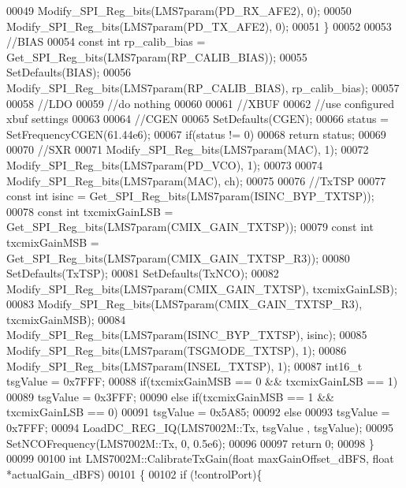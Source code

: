 \begin{DoxyCode}
00049         Modify_SPI_Reg_bits(LMS7param(PD_RX_AFE2), 0);
00050         Modify_SPI_Reg_bits(LMS7param(PD_TX_AFE2), 0);
00051     \}
00052 
00053     \textcolor{comment}{//BIAS}
00054     \textcolor{keyword}{const} \textcolor{keywordtype}{int} rp\_calib\_bias = Get_SPI_Reg_bits(LMS7param(RP_CALIB_BIAS));
00055     SetDefaults(BIAS);
00056     Modify_SPI_Reg_bits(LMS7param(RP_CALIB_BIAS), rp\_calib\_bias);
00057 
00058     \textcolor{comment}{//LDO}
00059     \textcolor{comment}{//do nothing}
00060 
00061     \textcolor{comment}{//XBUF}
00062     \textcolor{comment}{//use configured xbuf settings}
00063 
00064     \textcolor{comment}{//CGEN}
00065     SetDefaults(CGEN);
00066     status = SetFrequencyCGEN(61.44e6);
00067     \textcolor{keywordflow}{if}(status != 0)
00068         \textcolor{keywordflow}{return} status;
00069 
00070     \textcolor{comment}{//SXR}
00071     Modify_SPI_Reg_bits(LMS7param(MAC), 1);
00072     Modify_SPI_Reg_bits(LMS7param(PD_VCO), 1);
00073 
00074     Modify_SPI_Reg_bits(LMS7param(MAC), ch);
00075 
00076     \textcolor{comment}{//TxTSP}
00077     \textcolor{keyword}{const} \textcolor{keywordtype}{int} isinc = Get_SPI_Reg_bits(LMS7param(ISINC_BYP_TXTSP));
00078     \textcolor{keyword}{const} \textcolor{keywordtype}{int} txcmixGainLSB = Get_SPI_Reg_bits(LMS7param(CMIX_GAIN_TXTSP));
00079     \textcolor{keyword}{const} \textcolor{keywordtype}{int} txcmixGainMSB = Get_SPI_Reg_bits(LMS7param(CMIX_GAIN_TXTSP_R3));
00080     SetDefaults(TxTSP);
00081     SetDefaults(TxNCO);
00082     Modify_SPI_Reg_bits(LMS7param(CMIX_GAIN_TXTSP), txcmixGainLSB);
00083     Modify_SPI_Reg_bits(LMS7param(CMIX_GAIN_TXTSP_R3), txcmixGainMSB);
00084     Modify_SPI_Reg_bits(LMS7param(ISINC_BYP_TXTSP), isinc);
00085     Modify_SPI_Reg_bits(LMS7param(TSGMODE_TXTSP), 1);
00086     Modify_SPI_Reg_bits(LMS7param(INSEL_TXTSP), 1);
00087     int16\_t tsgValue = 0x7FFF;
00088     \textcolor{keywordflow}{if}(txcmixGainMSB == 0 && txcmixGainLSB == 1)
00089         tsgValue = 0x3FFF;
00090     \textcolor{keywordflow}{else} \textcolor{keywordflow}{if}(txcmixGainMSB == 1 && txcmixGainLSB == 0)
00091         tsgValue = 0x5A85;
00092     \textcolor{keywordflow}{else}
00093         tsgValue = 0x7FFF;
00094     LoadDC_REG_IQ(LMS7002M::Tx, tsgValue , tsgValue);
00095     SetNCOFrequency(LMS7002M::Tx, 0, 0.5e6);
00096 
00097     \textcolor{keywordflow}{return} 0;
00098 \}
00099 
00100 \textcolor{keywordtype}{int} LMS7002M::CalibrateTxGain(\textcolor{keywordtype}{float} maxGainOffset\_dBFS, \textcolor{keywordtype}{float} *actualGain\_dBFS)
00101 \{
00102     \textcolor{keywordflow}{if} (!controlPort)\{

\end{DoxyCode}

